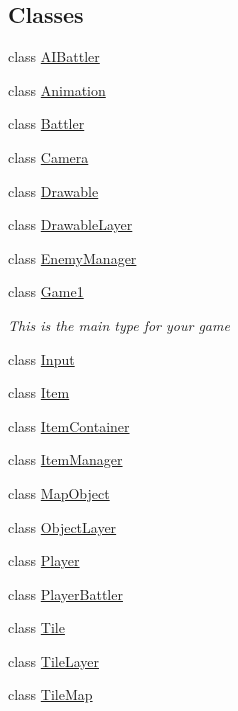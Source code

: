 \subsection*{Classes}
\begin{DoxyCompactItemize}
\item 
class \hyperlink{class_simple_r_p_g_1_1_a_i_battler}{A\+I\+Battler}
\item 
class \hyperlink{class_simple_r_p_g_1_1_animation}{Animation}
\item 
class \hyperlink{class_simple_r_p_g_1_1_battler}{Battler}
\item 
class \hyperlink{class_simple_r_p_g_1_1_camera}{Camera}
\item 
class \hyperlink{class_simple_r_p_g_1_1_drawable}{Drawable}
\item 
class \hyperlink{class_simple_r_p_g_1_1_drawable_layer}{Drawable\+Layer}
\item 
class \hyperlink{class_simple_r_p_g_1_1_enemy_manager}{Enemy\+Manager}
\item 
class \hyperlink{class_simple_r_p_g_1_1_game1}{Game1}
\begin{DoxyCompactList}\small\item\em This is the main type for your game \end{DoxyCompactList}\item 
class \hyperlink{class_simple_r_p_g_1_1_input}{Input}
\item 
class \hyperlink{class_simple_r_p_g_1_1_item}{Item}
\item 
class \hyperlink{class_simple_r_p_g_1_1_item_container}{Item\+Container}
\item 
class \hyperlink{class_simple_r_p_g_1_1_item_manager}{Item\+Manager}
\item 
class \hyperlink{class_simple_r_p_g_1_1_map_object}{Map\+Object}
\item 
class \hyperlink{class_simple_r_p_g_1_1_object_layer}{Object\+Layer}
\item 
class \hyperlink{class_simple_r_p_g_1_1_player}{Player}
\item 
class \hyperlink{class_simple_r_p_g_1_1_player_battler}{Player\+Battler}
\item 
class \hyperlink{class_simple_r_p_g_1_1_tile}{Tile}
\item 
class \hyperlink{class_simple_r_p_g_1_1_tile_layer}{Tile\+Layer}
\item 
class \hyperlink{class_simple_r_p_g_1_1_tile_map}{Tile\+Map}
\end{DoxyCompactItemize}
